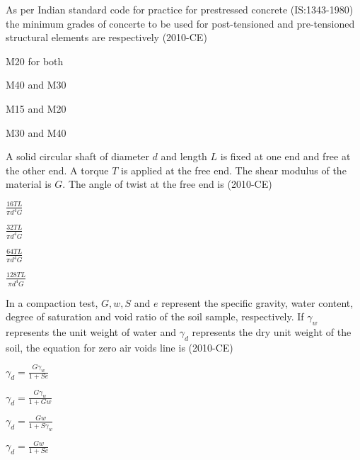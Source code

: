 \item As per Indian standard code for practice for prestressed concrete (IS:1343-1980) the minimum grades of concerte to be used for post-tensioned and pre-tensioned structural elements are respectively \hfill{(2010-CE)}

\begin{enumerate}
    \begin{multicols}{4} 
\item M20 for both
 \item M40 and M30
 \item M15 and M20
 \item M30 and M40
   \end{multicols}
\end{enumerate}


\item A solid circular shaft of diameter $d$ and length $L$ is fixed at one end and free at the other end. A torque $T$ is applied at the free end. The shear modulus of the material is $G$. The angle of twist at the free end is \hfill{(2010-CE)}

\begin{enumerate}
\end{enumerate}
	
\item  In a compaction test, $G, w, S$ and $e$ represent the specific gravity, water content, degree of saturation and void ratio of the soil sample, respectively. If $\gamma_{w}$ represents the unit weight of water and $\gamma_{d}$ represents the dry unit weight of the soil, the equation for zero air voids line is \hfill{(2010-CE)}

\begin{enumerate}
    \begin{multicols}{4} 
    \item $\gamma_{d} = \frac{G \gamma_{w}}{1+Se}     $

\item $\gamma_{d} = \frac{G \gamma_{w}}{1+Gw}     $

\item $\gamma_{d} = \frac{Gw} {1+S\gamma_{w}}     $

\item $\gamma_{d} = \frac{Gw}{1+Se}     $
  \end{multicols}
\end{enumerate}
	

